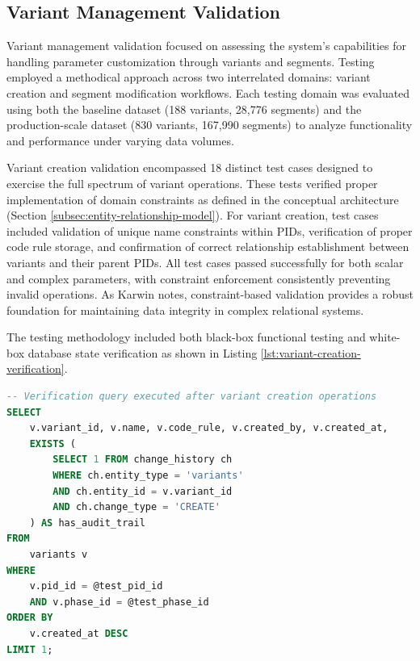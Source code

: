 \subsection{Variant Management Validation}
\label{subsec:variant-management-validation}

Variant management validation focused on assessing the system's capabilities for handling parameter customization through variants and segments. Testing employed a methodical approach across two interrelated domains: variant creation and segment modification workflows. Each testing domain was evaluated using both the baseline dataset (188 variants, 28,776 segments) and the production-scale dataset (830 variants, 167,990 segments) to analyze functionality and performance under varying data volumes.

Variant creation validation encompassed 18 distinct test cases designed to exercise the full spectrum of variant operations. These tests verified proper implementation of domain constraints as defined in the conceptual architecture (Section \ref{subsec:entity-relationship-model}). For variant creation, test cases included validation of unique name constraints within PIDs, verification of proper code rule storage, and confirmation of correct relationship establishment between variants and their parent PIDs. All test cases passed successfully for both scalar and complex parameters, with constraint enforcement consistently preventing invalid operations. As Karwin \cite{karwin2010sql} notes, constraint-based validation provides a robust foundation for maintaining data integrity in complex relational systems.

The testing methodology included both black-box functional testing and white-box database state verification as shown in Listing \ref{lst:variant-creation-verification}.

\begin{lstlisting}[language=SQL, caption={Variant Creation Verification Query}, label={lst:variant-creation-verification}]
-- Verification query executed after variant creation operations
SELECT 
    v.variant_id, v.name, v.code_rule, v.created_by, v.created_at,
    EXISTS (
        SELECT 1 FROM change_history ch 
        WHERE ch.entity_type = 'variants' 
        AND ch.entity_id = v.variant_id
        AND ch.change_type = 'CREATE'
    ) AS has_audit_trail
FROM 
    variants v
WHERE 
    v.pid_id = @test_pid_id
    AND v.phase_id = @test_phase_id
ORDER BY 
    v.created_at DESC
LIMIT 1;
\end{lstlisting}

